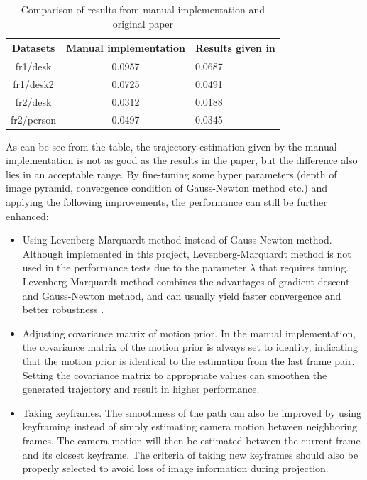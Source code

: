 \documentclass[acmsmall, nonacm, 11pt]{acmart}
\begin{document}
\begin{table}[h]
  \caption{Comparison of results from manual implementation and original paper}
  \label{tab_results}
  \begin{tabular}{ccl}
    \toprule
    Datasets & Manual implementation & Results given in \cite{kerl2013robust}\\
    \midrule
    fr1/desk & 0.0957 & 0.0687\\
    fr1/desk2 & 0.0725 & 0.0491\\
    fr2/desk & 0.0312 & 0.0188\\
    fr2/person & 0.0497 & 0.0345\\
  \bottomrule
\end{tabular}
\end{table}

As can be see from the table, the trajectory estimation given by the manual implementation is not as good as the results in the paper, but the difference also lies in an acceptable range. By fine-tuning some hyper parameters (depth of image pyramid, convergence condition of Gauss-Newton method etc.) and applying the following improvements, the performance can still be further enhanced:

\begin{itemize}
    \item Using Levenberg-Marquardt method instead of Gauss-Newton method. Although implemented in this project, Levenberg-Marquardt method is not used in the performance tests due to the parameter $\lambda$ that requires tuning. Levenberg-Marquardt method combines the advantages of gradient descent and Gauss-Newton method, and can usually yield faster convergence and better robustness \cite{madson2004methods}.
    \item Adjusting covariance matrix of motion prior. In the manual implementation, the covariance matrix of the motion prior is always set to identity, indicating that the motion prior is identical to the estimation from the last frame pair. Setting the covariance matrix to appropriate values can smoothen the generated trajectory and result in higher performance.
    \item Taking keyframes. The smoothness of the path can also be improved by using keyframing instead of simply estimating camera motion between neighboring frames. The camera motion will then be estimated between the current frame and its closest keyframe. The criteria of taking new keyframes should also be properly selected to avoid loss of image information during projection.
\end{itemize}



\end{document}
